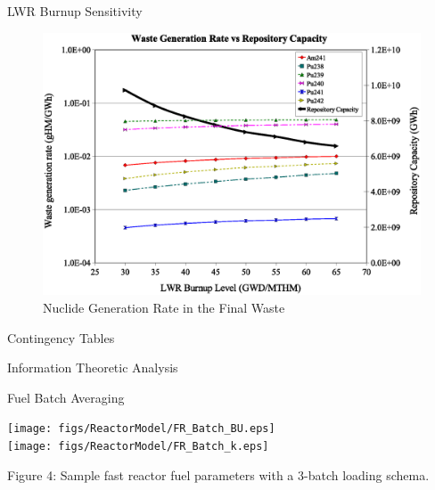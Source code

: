 \documentclass[pdf, autumn, slideColor, nocolorBG]{prosper}
\begin{document}
\begin{slide}{LWR Burnup Sensitivity}
\begin{center}
\begin{figure}
\includegraphics[scale=0.4]{figs/LWR_BUd_sensitivity_RepCap.eps}
\caption{Nuclide Generation Rate in the Final Waste}
\end{figure}
\end{center}
\end{slide}






%
%

\begin{slide}{Contingency Tables}
\vspace{3.5cm}
\begin{center}
\Large
Information Theoretic Analysis
\end{center}
\end{slide}












\begin{slide}{Fuel Batch Averaging}
\begin{minipage}[t]{7cm}
\begin{center}
\texttt{[image: figs/ReactorModel/FR\_Batch\_BU.eps]}\\
\texttt{[image: figs/ReactorModel/FR\_Batch\_k.eps]}
\end{center}
\end{minipage}
\begin{minipage}{4.25cm}
\begin{center}
Figure 4: Sample fast reactor fuel parameters with a 3-batch loading schema.
\end{center}
\end{minipage}
\end{slide}
\end{document}
